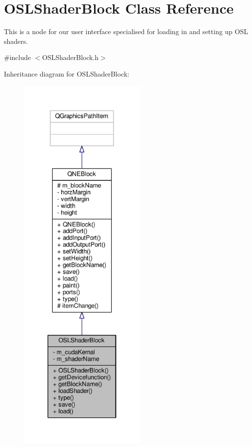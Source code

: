 \hypertarget{class_o_s_l_shader_block}{\section{O\-S\-L\-Shader\-Block Class Reference}
\label{class_o_s_l_shader_block}
}


This is a node for our user interface specialised for loading in and setting up O\-S\-L shaders.  




{\ttfamily \#include $<$O\-S\-L\-Shader\-Block.\-h$>$}



Inheritance diagram for O\-S\-L\-Shader\-Block\-:
\nopagebreak
\begin{figure}[H]
\begin{center}
\leavevmode
\includegraphics[height=550pt]{class_o_s_l_shader_block__inherit__graph}
\end{center}
\end{figure}


